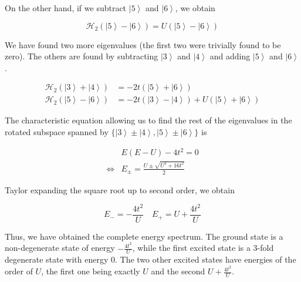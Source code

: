 \documentclass[10pt, twocolumn, twoside]{article}
\begin{document}
On the other hand, if we subtract $\left| 5 \right\rangle$ and $\left| 6 \right\rangle$, we obtain

\begin{equation}
\mathcal{H}_{2}(\left| 5 \right\rangle -\left| 6 \right\rangle) = U( \left| 5 \right\rangle - \left| 6 \right\rangle)
\end{equation}

We have found two more eigenvalues (the first two were trivially found to be zero). The others are found by subtracting $\left| 3 \right\rangle$ and $\left| 4 \right\rangle $ and adding $\left| 5 \right\rangle$ and $\left| 6 \right\rangle$.

\begin{equation}
\begin{split}
\mathcal{H}_{2} ( \left| 3 \right\rangle + \left| 4 \right\rangle ) &= -2 t  (\left| 5 \right\rangle + \left| 6 \right\rangle) \\
\mathcal{H}_{2}(\left| 5 \right\rangle -\left| 6 \right\rangle) &= - 2 t (\left| 3 \right\rangle - \left| 4 \right\rangle ) + U (\left| 5 \right\rangle + \left| 6 \right\rangle) 
\end{split}
\end{equation}

The characteristic equation allowing us to find the rest of the eigenvalues in the rotated subspace spanned by $\{\left| 3 \right\rangle \pm \left| 4 \right\rangle, \left| 5 \right\rangle \pm \left| 6 \right\rangle  \}$ is

\begin{equation}
\begin{split}
&E ( E - U ) - 4 t^2 = 0 \\
\iff&E_{\pm} = \frac{U \pm \sqrt{U^2 + 16 t^2}}{2}
\end{split}
\end{equation}

Taylor expanding the square root up to second order, we obtain

\begin{equation}
E_- = -\frac{4t^2}{U} \quad E_+ = U + \frac{4t^2}{U}
\end{equation}

Thus, we have obtained the complete energy spectrum. The ground state is a non-degenerate state of energy $-\frac{4t^2}{U}$, while the first excited state is a 3-fold degenerate state with energy $0$. The two other excited states have energies of the order of $U$, the first one being exactly $U$ and the second $U + \frac{4t^2}{U}$.
\end{document}
